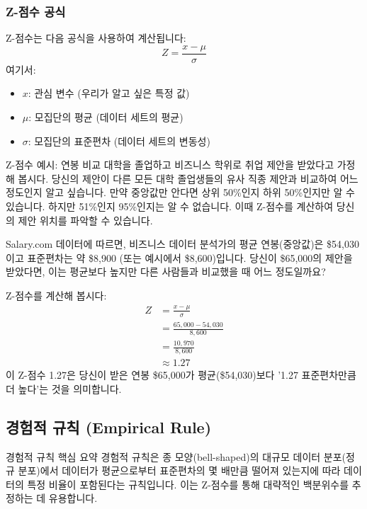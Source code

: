 \documentclass[11pt,a4paper]{article}
\begin{document}
\subsubsection*{Z-점수 공식}
Z-점수는 다음 공식을 사용하여 계산됩니다:
\[ Z = \frac{x - \mu}{\sigma} \]
여기서:
\begin{itemize}
    \item \(x\): 관심 변수 (우리가 알고 싶은 특정 값)
    \item \(\mu\): 모집단의 평균 (데이터 세트의 평균)
    \item \(\sigma\): 모집단의 표준편차 (데이터 세트의 변동성)
\end{itemize}

\begin{examplebox}{Z-점수 예시: 연봉 비교}
대학을 졸업하고 비즈니스 학위로 취업 제안을 받았다고 가정해 봅시다. 당신의 제안이 다른 모든 대학 졸업생들의 유사 직종 제안과 비교하여 어느 정도인지 알고 싶습니다. 만약 중앙값만 안다면 상위 50\%인지 하위 50\%인지만 알 수 있습니다. 하지만 51\%인지 95\%인지는 알 수 없습니다. 이때 Z-점수를 계산하여 당신의 제안 위치를 파악할 수 있습니다.

Salary.com 데이터에 따르면, 비즈니스 데이터 분석가의 평균 연봉(중앙값)은 \$54,030이고 표준편차는 약 \$8,900 (또는 예시에서 \$8,600)입니다. 당신이 \$65,000의 제안을 받았다면, 이는 평균보다 높지만 다른 사람들과 비교했을 때 어느 정도일까요?

Z-점수를 계산해 봅시다:
\begin{align*} Z &= \frac{x - \mu}{\sigma} \\ &= \frac{65,000 - 54,030}{8,600} \\ &= \frac{10,970}{8,600} \\ &\approx 1.27 \end{align*}
이 Z-점수 1.27은 당신이 받은 연봉 \$65,000가 평균(\$54,030)보다 '1.27 표준편차만큼 더 높다'는 것을 의미합니다.
\end{examplebox}

\newpage
\subsection{경험적 규칙 (Empirical Rule)}

\begin{summarybox}{경험적 규칙 핵심 요약}
경험적 규칙은 종 모양(bell-shaped)의 대규모 데이터 분포(정규 분포)에서 데이터가 평균으로부터 표준편차의 몇 배만큼 떨어져 있는지에 따라 데이터의 특정 비율이 포함된다는 규칙입니다. 이는 Z-점수를 통해 대략적인 백분위수를 추정하는 데 유용합니다.
\end{summarybox}
\end{document}
